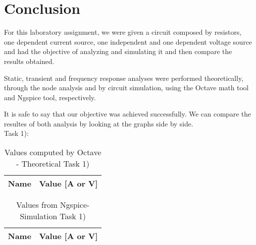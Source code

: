 
\section{Conclusion}
\label{sec:conclusion}


For this laboratory assignment, we were given a circuit composed by resistors, one dependent current source,
one independent and one dependent voltage source and had the objective of analyzing and simulating it and
then compare the results obtained.

Static, transient and frequency response analyses were performed theoretically, through the node analysis
and by circuit simulation, using the Octave math tool and Ngspice tool, respectively. 

It is safe to say that our objective was achieved successfully. We can compare the resultes of both
analysis by looking at the graphs side by side.  \\

Task 1):

\begin{table}[ht]
	\centering
	\begin{tabular}{|l|r|}
    		\hline    
    		{\bf Name} & {\bf Value [A or V]} \\ \hline
    		
  	\end{tabular}
  	\caption{Values computed by Octave - Theoretical Task 1)}
 
\label{tab:node}
\end{table}

\begin{table}[ht]
	\centering
	\begin{tabular}{|l|r|}
		\hline    
		{\bf Name} & {\bf Value [A or V]} \\ \hline
    		
	\end{tabular}
	
	\caption{Values from Ngspice- Simulation Task 1)}
    
\label{tab:op1}
\end{table}

